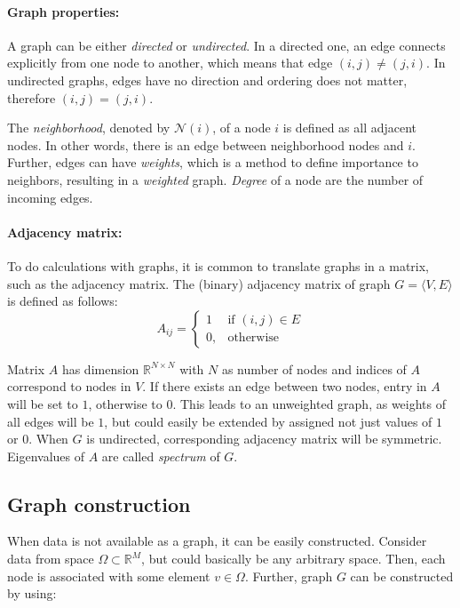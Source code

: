\paragraph{Graph properties:}
A graph can be either \textit{directed} or \textit{undirected}. 
In a directed one, an edge connects explicitly from one node to another, which means that edge $(i, j) \neq (j, i)$. 
In undirected graphs, edges have no direction and ordering does not matter, therefore $(i, j) = (j, i)$.

The \textit{neighborhood}, denoted by $\mathcal{N}(i)$, of a node $i$  is defined as all adjacent nodes.
In other words, there is an edge between neighborhood nodes and $i$. 
Further, edges can have \textit{weights}, which is a method to define importance to neighbors, resulting in a \textit{weighted} graph.
\textit{Degree} of a node are the number of incoming edges.

\paragraph{Adjacency matrix:}
To do calculations with graphs, it is common to translate graphs in a matrix, 
such as the adjacency matrix.
The (binary) adjacency matrix of graph $G = \langle V, E \rangle$ is defined as follows:
\begin{equation}
    \label{eg:AdjacencyMatrix}
    A_{ij} =    
    \begin{cases}
        1  & \text{if } (i, j) \in E \\
        0, & \text{otherwise}
    \end{cases}
\end{equation}

Matrix $A$ has dimension $\mathbb{R}^{N \times N}$ with $N$ as number of nodes
and indices of $A$ correspond to nodes in $V$.
If there exists an edge between two nodes, entry in $A$ will be set to $1$, otherwise to $0$.
This leads to an unweighted graph, as weights of all edges will be $1$, 
but could easily be extended by assigned not just values of $1$ or $0$. 
When $G$ is undirected, corresponding adjacency matrix will be symmetric. 
Eigenvalues of $A$ are called \textit{spectrum} of $G$.


\subsection{Graph construction}
\label{sec:graphConstruction}
When data is not available as a graph, it can be easily constructed.
Consider data from space $\Omega \subset \mathbb{R}^M $, but could basically be any arbitrary space.
Then, each node is associated with some element $v \in \Omega$. 
Further, graph $G$ can be constructed by using:


